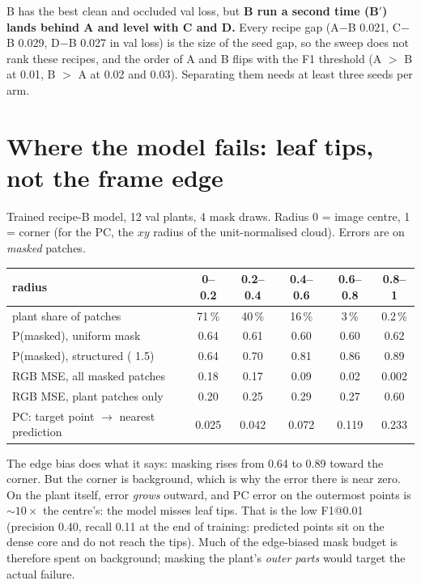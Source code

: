 \documentclass[10pt]{article}
\newcommand{\key}[1]{\texttt{\detokenize{#1}}}
\begin{document}
B has the best clean and occluded val loss, but \textbf{B run a second time (B$'$) lands behind A
and level with C and D.} Every recipe gap (A$-$B 0.021, C$-$B 0.029, D$-$B 0.027 in val loss) is the
size of the seed gap, so the sweep does not rank these recipes, and the order of A and B flips with
the F1 threshold (A $>$ B at 0.01, B $>$ A at 0.02 and 0.03). Separating them needs at least three
seeds per arm.

\section*{Where the model fails: leaf tips, not the frame edge}
Trained recipe-B model, 12 val plants, 4 mask draws. Radius 0 = image centre, 1 = corner (for the PC,
the $xy$ radius of the unit-normalised cloud). Errors are on \emph{masked} patches.

\begin{center}
\centering\small
\begin{tabular}{lccccc}
\toprule
radius & 0--0.2 & 0.2--0.4 & 0.4--0.6 & 0.6--0.8 & 0.8--1 \\
\midrule
plant share of patches & 71\,\% & 40\,\% & 16\,\% & 3\,\% & 0.2\,\% \\
P(masked), uniform mask & 0.64 & 0.61 & 0.60 & 0.60 & 0.62 \\
P(masked), structured (\key{center_bias} 1.5) & 0.64 & 0.70 & 0.81 & 0.86 & 0.89 \\
RGB MSE, all masked patches & 0.18 & 0.17 & 0.09 & 0.02 & 0.002 \\
RGB MSE, plant patches only & 0.20 & 0.25 & 0.29 & 0.27 & 0.60 \\
PC: target point $\to$ nearest prediction & 0.025 & 0.042 & 0.072 & 0.119 & 0.233 \\
\bottomrule
\end{tabular}
\end{center}

The edge bias does what it says: masking rises from 0.64 to 0.89 toward the corner. But the corner
is background, which is why the error there is near zero. On the plant itself, error \emph{grows}
outward, and PC error on the outermost points is ${\sim}10\times$ the centre's: the model misses leaf
tips. That is the low F1@0.01 (precision 0.40, recall 0.11 at the end of training: predicted points
sit on the dense core and do not reach the tips). Much of the edge-biased mask budget is therefore
spent on background; masking the plant's \emph{outer parts} would target the actual failure.
\end{document}
